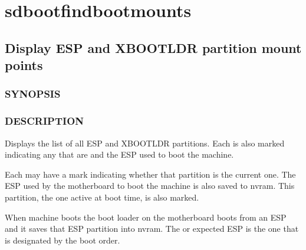 \documentclass[letterpaper,11pt,english]{sphinxmanual}
\begin{document}
\begin{sphinxVerbatim}[commandchars=\\\{\}]
  
\end{sphinxVerbatim}

\sphinxstepscope


\section{sd\sphinxhyphen{}boot\sphinxhyphen{}find\sphinxhyphen{}boot\sphinxhyphen{}mounts}
\label{\detokenize{_build/man-ready/sd-boot-find-boot-mounts.8:sd-boot-find-boot-mounts}}\label{\detokenize{_build/man-ready/sd-boot-find-boot-mounts.8::doc}}

\subsection{Display ESP and XBOOTLDR partition mount points}
\label{\detokenize{_build/man-ready/sd-boot-find-boot-mounts.8:display-esp-and-xbootldr-partition-mount-points}}

\subsubsection{SYNOPSIS}
\label{\detokenize{_build/man-ready/sd-boot-find-boot-mounts.8:synopsis}}
\sphinxAtStartPar
{}


\subsubsection{DESCRIPTION}
\label{\detokenize{_build/man-ready/sd-boot-find-boot-mounts.8:description}}
\sphinxAtStartPar
Displays the list of all ESP and XBOOTLDR partitions. Each is also marked
indicating any that are  and the  ESP used to boot the machine.

\sphinxAtStartPar
Each may have
a mark indicating whether that partition is the current one. The ESP
used by the motherboard to boot the machine is also saved to nvram.
This partition, the one active at boot time, is also marked.

\sphinxAtStartPar
When machine boots the boot loader on the motherboard boots from an ESP and it saves
that  ESP partition into nvram. The  or expected ESP
is the one that is designated by the boot order.
\end{document}
